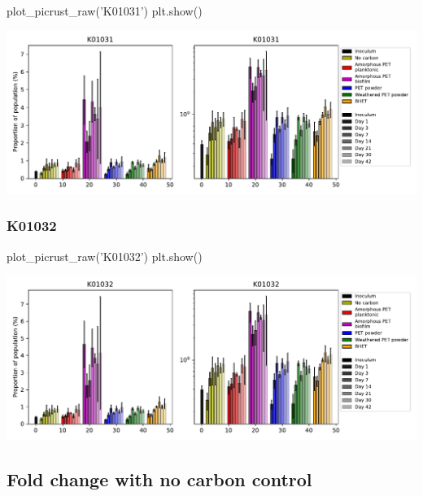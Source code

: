 \documentclass[
]{article}
\newenvironment{Shaded}{\begin{snugshade}}{\end{snugshade}}
\newcommand{\NormalTok}[1]{#1}
\newcommand{\StringTok}[1]{\textcolor[rgb]{0.31,0.60,0.02}{#1}}
\begin{document}
\begin{Shaded}
\begin{Highlighting}[]
\NormalTok{plot_picrust_raw(}\StringTok{'K01031'}\NormalTok{)}
\NormalTok{plt.show()}
\end{Highlighting}
\end{Shaded}

\includegraphics{20-6-15-PET-plastisphere-PICRUSt2_files/figure-latex/plot_raw_K01031-1.pdf}

\hypertarget{k01032}{%
\subsubsection{K01032}\label{k01032}}

\begin{Shaded}
\begin{Highlighting}[]
\NormalTok{plot_picrust_raw(}\StringTok{'K01032'}\NormalTok{)}
\NormalTok{plt.show()}
\end{Highlighting}
\end{Shaded}

\includegraphics{20-6-15-PET-plastisphere-PICRUSt2_files/figure-latex/plot_raw_K01032-1.pdf}

\hypertarget{fold-change-with-no-carbon-control}{%
\subsection{Fold change with no carbon
control}\label{fold-change-with-no-carbon-control}}
\end{document}
